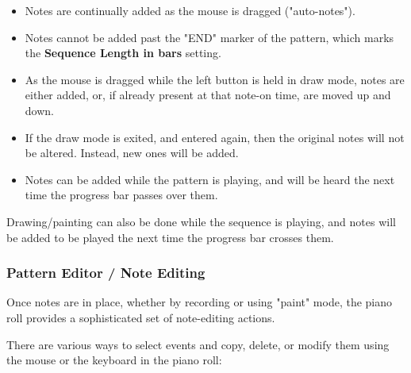    \begin{itemize}
      \item Notes are continually added as the mouse is dragged ("auto-notes").
      \item Notes cannot be added past the "END" marker of the pattern, which
         marks the \textbf{Sequence Length in bars} setting.
      \item As the mouse is dragged while the left button is held in draw mode,
         notes are either added, or, if already present at that note-on time,
         are moved up and down.
      \item If the draw mode is exited, and entered again, then the original
         notes will not be altered.  Instead, new ones will be added.
      \item Notes can be added while the pattern is playing, and will be heard
         the next time the progress bar passes over them.
   \end{itemize}

   Drawing/painting can also be done while the sequence is playing,
   and notes will be added to be played the next time the progress bar crosses
   them.

\subsubsection{Pattern Editor / Note Editing}
\label{subsubsec:pattern_editor_note_editing}

   Once notes are in place, whether by recording or using "paint" mode,
   the piano roll provides a sophisticated set of note-editing
   actions.

   \setcounter{ItemCounter}{0}      %

   There are various ways to select events and copy, delete, or modify them
   using the mouse or the keyboard in the piano roll:

